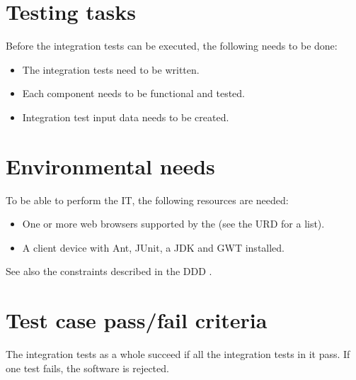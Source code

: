 \section{Testing tasks}
Before the integration tests can be executed, the following needs to be done:
\begin{itemize}
\item The integration tests need to be written.
\item Each component needs to be functional and tested.
\item Integration test input data needs to be created.
\end{itemize}

\section{Environmental needs}
To be able to perform the IT, the following resources are needed:

\begin{itemize}
  \item One or more web browsers supported by the \applicationname{} (see the URD \cite{urd} for a list).
  \item A client device with Ant, JUnit, a JDK and GWT installed.
\end{itemize}

\noindent See also the constraints described in the DDD \cite{DDD}.

\section{Test case pass/fail criteria}
The integration tests as a whole succeed if all the integration tests in it pass. If one test fails, the software is rejected.
